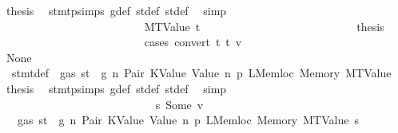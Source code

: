 \begin{isabellebody}
\ {\isacharquery}{\kern0pt}thesis\ \isamarkupfalse%
\ stmt{\isachardot}{\kern0pt}psimps{\isacharparenleft}{\kern0pt}{}{\isacharparenright}{\kern0pt}\ g{\isacharunderscore}{\kern0pt}def\ st{\isacharprime}{\kern0pt}{\isacharunderscore}{\kern0pt}def\ st{\isacharprime}{\kern0pt}{\isacharprime}{\kern0pt}{\isacharunderscore}{\kern0pt}def\ \isamarkupfalse%
\ simp\isanewline
\ \ \ \ \ \ \ \ \ \ \ \ \ \ \ \ \ \ \ \ \ \ \isamarkupfalse%
\isanewline
\ \ \ \ \ \ \ \ \ \ \ \ \ \ \ \ \ \ \ \ \ \ \ \ \isamarkupfalse%
\ {\isacharparenleft}{\kern0pt}MTValue\ t{\isacharprime}{\kern0pt}{\isacharparenright}{\kern0pt}\isanewline
\ \ \ \ \ \ \ \ \ \ \ \ \ \ \ \ \ \ \ \ \ \ \ \ \isamarkupfalse%
\ \isamarkupfalse%
\ {\isacharquery}{\kern0pt}thesis\isanewline
\ \ \ \ \ \ \ \ \ \ \ \ \ \ \ \ \ \ \ \ \ \ \ \ \isamarkupfalse%
\ {\isacharparenleft}{\kern0pt}cases\ {\isachardoublequoteopen}convert\ t\ t{\isacharprime}{\kern0pt}\ v\ {\isachardoublequoteclose}{\isacharparenright}{\kern0pt}\isanewline
\ \ \ \ \ \ \ \ \ \ \ \ \ \ \ \ \ \ \ \ \ \ \ \ \ \ \isamarkupfalse%
\ None\isanewline
\ \ \ \ \ \ \ \ \ \ \ \ \ \ \ \ \ \ \ \ \ \ \ \ \ \ \isamarkupfalse%
\ {}{\isacharparenleft}{\kern0pt}{}{\isacharparenright}{\kern0pt}\ stmt{\isacharunderscore}{\kern0pt}def\ {\isacharbackquoteopen}{\isasymnot}\ gas\ st\ {\isasymle}\ g{\isacharbackquoteclose}\ n\ Pair\ KValue\ Value\ n{}\ p{}\ LMemloc\ Memory\ MTValue\ \isamarkupfalse%
\ {\isacharquery}{\kern0pt}thesis\ \isamarkupfalse%
\ stmt{\isachardot}{\kern0pt}psimps{\isacharparenleft}{\kern0pt}{}{\isacharparenright}{\kern0pt}\ g{\isacharunderscore}{\kern0pt}def\ st{\isacharprime}{\kern0pt}{\isacharunderscore}{\kern0pt}def\ st{\isacharprime}{\kern0pt}{\isacharprime}{\kern0pt}{\isacharunderscore}{\kern0pt}def\ \isamarkupfalse%
\ simp\isanewline
\ \ \ \ \ \ \ \ \ \ \ \ \ \ \ \ \ \ \ \ \ \ \ \ \isamarkupfalse%
\isanewline
\ \ \ \ \ \ \ \ \ \ \ \ \ \ \ \ \ \ \ \ \ \ \ \ \ \ \isamarkupfalse%
\ s{}{\isacharcolon}{\kern0pt}\ {\isacharparenleft}{\kern0pt}Some\ v{\isacharprime}{\kern0pt}{\isacharparenright}{\kern0pt}\isanewline
\ \ \ \ \ \ \ \ \ \ \ \ \ \ \ \ \ \ \ \ \ \ \ \ \ \ \isamarkupfalse%
\ {}{\isacharparenleft}{\kern0pt}{}{\isacharparenright}{\kern0pt}\ {\isacharbackquoteopen}{\isasymnot}\ gas\ st\ {\isasymle}\ g{\isacharbackquoteclose}\ n\ Pair\ KValue\ Value\ n{}\ p{}\ LMemloc\ Memory\ MTValue\ s{}\isanewline

\end{isabellebody}
